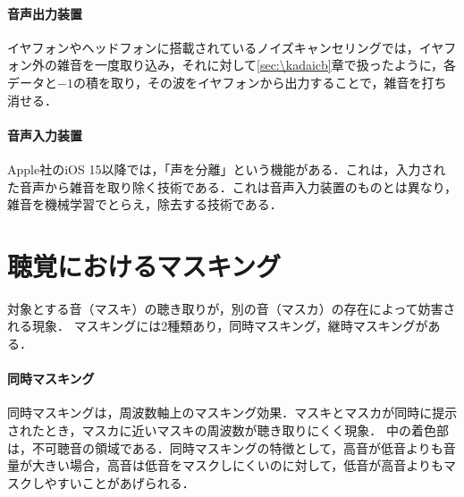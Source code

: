 \paragraph{音声出力装置}イヤフォンやヘッドフォンに搭載されているノイズキャンセリングでは，イヤフォン外の雑音を一度取り込み，それに対して\ref{sec:\kadaicb}章で扱ったように，各データと\(-1\)の積を取り，その波をイヤフォンから出力することで，雑音を打ち消せる．\par
\paragraph{音声入力装置}Apple社のiOS 15以降では，「声を分離」という機能がある．これは，入力された音声から雑音を取り除く技術である．これは音声入力装置のものとは異なり，雑音を機械学習でとらえ，除去する技術である．
\section{聴覚におけるマスキング}
対象とする音（マスキ）の聴き取りが，別の音（マスカ）の存在によって妨害される現象．
マスキングには2種類あり，同時マスキング，継時マスキングがある．
\paragraph{同時マスキング}同時マスキングは，周波数軸上のマスキング効果．マスキとマスカが同時に提示されたとき，マスカに近いマスキの周波数が聴き取りにくく現象\cite{マスキングと騒音対策}．
中の着色部は，不可聴音の領域である．同時マスキングの特徴として，高音が低音よりも音量が大きい場合，高音は低音をマスクしにくいのに対して，低音が高音よりもマスクしやすいことがあげられる．
